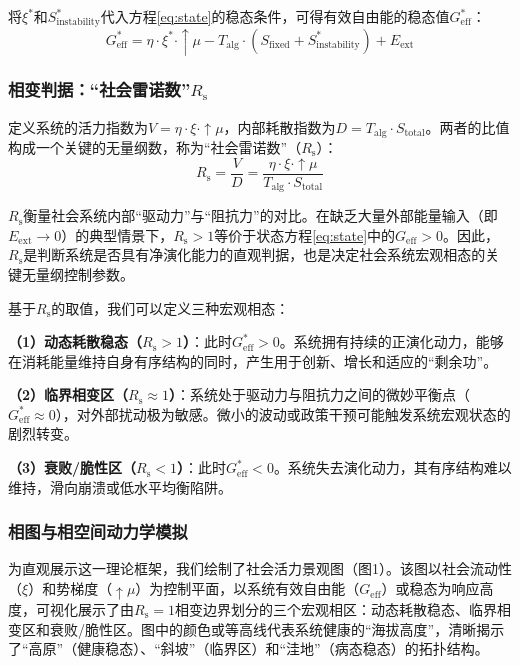 \documentclass[twocolumn]{ctexart}
\newcommand{\upmu}{\uparrow\!\mu}
\newcommand{\upxi}{\xi}
\newcommand{\upeta}{\eta}
\newcommand{\Sfix}{S_{\mathrm{fixed}}}
\newcommand{\Sinst}{S_{\mathrm{instability}}}
\newcommand{\Stot}{S_{\mathrm{total}}}
\newcommand{\Talg}{T_{\mathrm{alg}}}
\newcommand{\Geff}{G_{\mathrm{eff}}}
\newcommand{\Eext}{E_{\mathrm{ext}}}
\newcommand{\Rs}{R_{\mathrm{s}}}
\begin{document}
将$\upxi^*$和$\Sinst^*$代入方程\eqref{eq:state}的稳态条件，可得有效自由能的稳态值$\Geff^*$：
\begin{equation}\label{eq:Geff_steady}
\Geff^* = \upeta \cdot \upxi^* \cdot \upmu - \Talg \cdot (\Sfix + \Sinst^*) + \Eext
\end{equation}

\subsubsection{相变判据：“社会雷诺数”$\Rs$}

定义系统的活力指数为$V = \upeta \cdot \upxi \cdot \upmu$，内部耗散指数为$D = \Talg \cdot \Stot$。两者的比值构成一个关键的无量纲数，称为“社会雷诺数”（$\Rs$）：
\begin{equation}\label{eq:Rs}
\Rs = \frac{V}{D} = \frac{\upeta \cdot \upxi \cdot \upmu}{\Talg \cdot \Stot}
\end{equation}

$\Rs$衡量社会系统内部“驱动力”与“阻抗力”的对比。在缺乏大量外部能量输入（即$\Eext\to0$）的典型情景下，$\Rs>1$等价于状态方程\eqref{eq:state}中的$\Geff>0$。因此，$\Rs$是判断系统是否具有净演化能力的直观判据，也是决定社会系统宏观相态的关键无量纲控制参数。

基于$\Rs$的取值，我们可以定义三种宏观相态：

\textbf{（1）动态耗散稳态（$\Rs > 1$）}：此时$\Geff^* > 0$。系统拥有持续的正演化动力，能够在消耗能量维持自身有序结构的同时，产生用于创新、增长和适应的“剩余功”。

\textbf{（2）临界相变区（$\Rs \approx 1$）}：系统处于驱动力与阻抗力之间的微妙平衡点（$\Geff^* \approx 0$），对外部扰动极为敏感。微小的波动或政策干预可能触发系统宏观状态的剧烈转变。

\textbf{（3）衰败/脆性区（$\Rs < 1$）}：此时$\Geff^* < 0$。系统失去演化动力，其有序结构难以维持，滑向崩溃或低水平均衡陷阱。

\subsubsection{相图与相空间动力学模拟}

为直观展示这一理论框架，我们绘制了社会活力景观图（图1）。该图以社会流动性（$\upxi$）和势梯度（$\upmu$）为控制平面，以系统有效自由能（$\Geff$）或稳态为响应高度，可视化展示了由$\Rs=1$相变边界划分的三个宏观相区：动态耗散稳态、临界相变区和衰败/脆性区。图中的颜色或等高线代表系统健康的“海拔高度”，清晰揭示了“高原”（健康稳态）、“斜坡”（临界区）和“洼地”（病态稳态）的拓扑结构。
\end{document}
